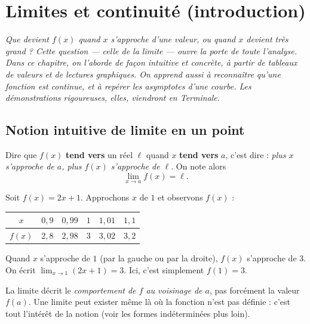 \chapter{Limites et continuité (introduction)}
\textit{Que devient $f(x)$ quand $x$ s'approche d'une valeur, ou quand $x$ devient
très grand ? Cette question — celle de la \emph{limite} — ouvre la porte de toute
l'analyse. Dans ce chapitre, on l'aborde de façon intuitive et concrète, à partir
de tableaux de valeurs et de lectures graphiques. On apprend aussi à reconnaître
qu'une fonction est \emph{continue}, et à repérer les \emph{asymptotes} d'une courbe.
Les démonstrations rigoureuses, elles, viendront en Terminale.}

\section{Notion intuitive de limite en un point}

\begin{aretenir}
Dire que $f(x)$ \textbf{tend vers} un réel $\ell$ quand $x$ \textbf{tend vers} $a$,
c'est dire : \emph{plus $x$ s'approche de $a$, plus $f(x)$ s'approche de $\ell$}.
On note alors
\[ \lim_{x\to a} f(x) = \ell. \]
\end{aretenir}

\begin{exemple}
Soit $f(x)=2x+1$. Approchons $x$ de $1$ et observons $f(x)$ :
\begin{center}\renewcommand{\arraystretch}{1.25}
\begin{tabular}{@{}c|ccccc@{}}
\toprule
$x$    & $0{,}9$ & $0{,}99$ & $1$ & $1{,}01$ & $1{,}1$ \\
\midrule
$f(x)$ & $2{,}8$ & $2{,}98$ & $3$ & $3{,}02$ & $3{,}2$ \\
\bottomrule
\end{tabular}
\end{center}
Quand $x$ s'approche de $1$ (par la gauche ou par la droite), $f(x)$ s'approche de $3$.
On écrit $\displaystyle\lim_{x\to 1}(2x+1)=3$. Ici, c'est simplement $f(1)=3$.
\end{exemple}

\begin{remarque}
La limite décrit le \emph{comportement de $f$ au voisinage de $a$}, pas forcément la
valeur $f(a)$. Une limite peut exister même là où la fonction n'est pas définie : c'est
tout l'intérêt de la notion (voir les formes indéterminées plus loin).
\end{remarque}

